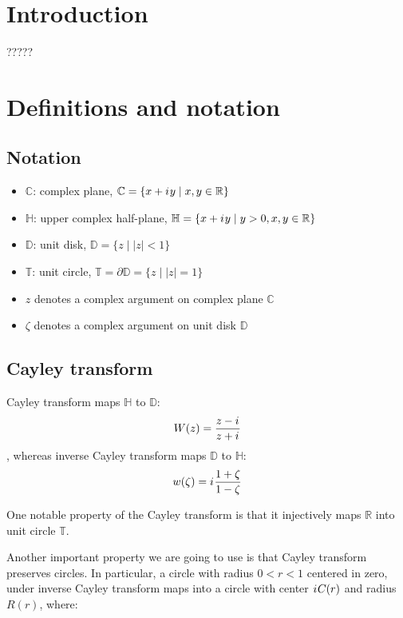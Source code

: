 \documentclass{gCOV2e}
\theoremstyle{plain}%
\theoremstyle{definition}
\theoremstyle{remark}
\newcommand{\iu}{{i\mkern1mu}} %
\newcommand\abs[1]{\left|#1\right|}
\begin{document}
\section{Introduction}

????? 

\section{Definitions and notation}

\subsection{Notation}

\begin{itemize}
\item $\mathbb{C}$: complex plane, $\mathbb{C} = \{ x + \iu y \mid x, y \in \mathbb{R} \}$ 
\item $\mathbb{H}$: upper complex half-plane, $\mathbb{H} = \{ x + \iu y \mid y > 0, x, y \in \mathbb{R} \}$
\item $\mathbb{D}$: unit disk, $\mathbb{D} = \{ z \mid \abs{z} < 1 \}$
\item $\mathbb{T}$: unit circle, $\mathbb{T} = \partial \mathbb{D} =  \{z \mid \abs{z} = 1 \}$
\item $z$ denotes a complex argument on complex plane $\mathbb{C}$
\item $\zeta$ denotes a complex argument on unit disk $\mathbb{D}$
\end{itemize}

\subsection{Cayley transform}

Cayley transform maps $\mathbb{H}$ to $\mathbb{D}$:
\[
W(z) = \frac{z - \iu}{z + \iu}
\]
, whereas inverse Cayley transform maps $\mathbb{D}$ to $\mathbb{H}$:
\begin{equation}\label{eq:cayley_inverse}
w(\zeta) = \iu \frac{1 + \zeta}{1 - \zeta}
\end{equation}

One notable property of the Cayley transform is that it injectively maps $\mathbb{R}$ into unit circle $\mathbb{T}$.

Another important property we are going to use is that Cayley transform preserves circles. In particular, a circle with radius $0 < r < 1$ centered in zero, under inverse Cayley transform maps into a circle with center $\iu C(r)$ and radius $R(r)$, where:
\end{document}
